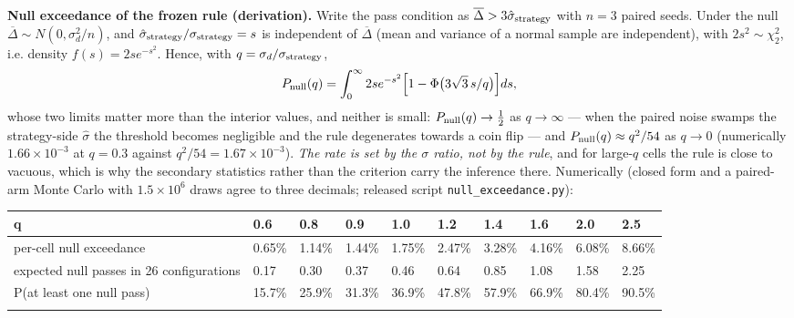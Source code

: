 \documentclass[pdflatex,sn-mathphys-ay]{sn-jnl}
\begin{document}
\textbf{Null exceedance of the frozen rule (derivation).} Write the pass condition as $\overline{\Delta} > 3\hat\sigma_{\rm strategy}$ with $n = 3$ paired seeds. Under the null $\overline{\Delta} \sim N(0, \sigma_d^2/n)$, and $\hat\sigma_{\rm strategy}/\sigma_{\rm strategy} = s$ is independent of $\overline{\Delta}$ (mean and variance of a normal sample are independent), with $2s^2 \sim \chi^2_2$, i.e. density $f(s) = 2s e^{-s^2}$. Hence, with $q = \sigma_d/\sigma_{\rm strategy}$, \[P_{\rm null}(q) = \int_0^\infty 2s e^{-s^2}\Big[1 - \Phi\big(3\sqrt{3}\,s/q\big)\Big] ds,\] whose two limits matter more than the interior values, and neither is small: $P_{\rm null}(q) \to \tfrac12$ as $q \to \infty$ --- when the paired noise swamps the strategy-side $\hat{\sigma}$ the threshold becomes negligible and the rule degenerates towards a coin flip --- and $P_{\rm null}(q) \approx q^2/54$ as $q \to 0$ (numerically $1.66\times10^{-3}$ at $q = 0.3$ against $q^2/54 = 1.67\times10^{-3}$). \emph{The rate is set by the \ensuremath{\sigma} ratio, not by the rule}, and for large-$q$ cells the rule is close to vacuous, which is why the secondary statistics rather than the criterion carry the inference there. Numerically (closed form and a paired-arm Monte Carlo with $1.5\times10^6$ draws agree to three decimals; released script \texttt{null\_exceedance.py}):

{\footnotesize
\setlength{\tabcolsep}{4pt}
\begin{longtable}{p{}p{}p{}p{}p{}p{}p{}p{}p{}p{}}
\toprule
q & 0.6 & 0.8 & 0.9 & 1.0 & 1.2 & 1.4 & 1.6 & 2.0 & 2.5 \\
\midrule
\endhead
per-cell null exceedance & 0.65\% & 1.14\% & 1.44\% & 1.75\% & 2.47\% & 3.28\% & 4.16\% & 6.08\% & 8.66\% \\
expected null passes in 26 configurations & 0.17 & 0.30 & 0.37 & 0.46 & 0.64 & 0.85 & 1.08 & 1.58 & 2.25 \\
P(at least one null pass) & 15.7\% & 25.9\% & 31.3\% & 36.9\% & 47.8\% & 57.9\% & 66.9\% & 80.4\% & 90.5\% \\
\botrule
\end{longtable}}
\end{document}
